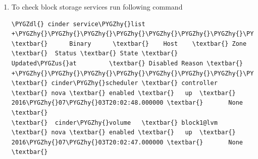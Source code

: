 \documentclass[letterpaper,10pt,english]{sphinxmanual}
\def\PYGZus{\char`\_}
\def\PYGZdl{\char`\$}
\def\PYGZhy{\char`\-}
\begin{document}
\begin{enumerate}
\item {} 
To check block storage services run following command

\begin{Verbatim}[commandchars=\\\{\}]
\PYGZdl{} cinder service\PYGZhy{}list
+\PYGZhy{}\PYGZhy{}\PYGZhy{}\PYGZhy{}\PYGZhy{}\PYGZhy{}\PYGZhy{}\PYGZhy{}\PYGZhy{}\PYGZhy{}\PYGZhy{}\PYGZhy{}\PYGZhy{}\PYGZhy{}\PYGZhy{}\PYGZhy{}\PYGZhy{}\PYGZhy{}+\PYGZhy{}\PYGZhy{}\PYGZhy{}\PYGZhy{}\PYGZhy{}\PYGZhy{}\PYGZhy{}\PYGZhy{}\PYGZhy{}\PYGZhy{}\PYGZhy{}\PYGZhy{}+\PYGZhy{}\PYGZhy{}\PYGZhy{}\PYGZhy{}\PYGZhy{}\PYGZhy{}+\PYGZhy{}\PYGZhy{}\PYGZhy{}\PYGZhy{}\PYGZhy{}\PYGZhy{}\PYGZhy{}\PYGZhy{}\PYGZhy{}+\PYGZhy{}\PYGZhy{}\PYGZhy{}\PYGZhy{}\PYGZhy{}\PYGZhy{}\PYGZhy{}+\PYGZhy{}\PYGZhy{}\PYGZhy{}\PYGZhy{}\PYGZhy{}\PYGZhy{}\PYGZhy{}\PYGZhy{}\PYGZhy{}\PYGZhy{}\PYGZhy{}\PYGZhy{}\PYGZhy{}\PYGZhy{}\PYGZhy{}\PYGZhy{}\PYGZhy{}\PYGZhy{}\PYGZhy{}\PYGZhy{}\PYGZhy{}\PYGZhy{}\PYGZhy{}\PYGZhy{}\PYGZhy{}\PYGZhy{}\PYGZhy{}\PYGZhy{}+\PYGZhy{}\PYGZhy{}\PYGZhy{}\PYGZhy{}\PYGZhy{}\PYGZhy{}\PYGZhy{}\PYGZhy{}\PYGZhy{}\PYGZhy{}\PYGZhy{}\PYGZhy{}\PYGZhy{}\PYGZhy{}\PYGZhy{}\PYGZhy{}\PYGZhy{}+
\textbar{}      Binary      \textbar{}    Host    \textbar{} Zone \textbar{}  Status \textbar{} State \textbar{}         Updated\PYGZus{}at         \textbar{} Disabled Reason \textbar{}
+\PYGZhy{}\PYGZhy{}\PYGZhy{}\PYGZhy{}\PYGZhy{}\PYGZhy{}\PYGZhy{}\PYGZhy{}\PYGZhy{}\PYGZhy{}\PYGZhy{}\PYGZhy{}\PYGZhy{}\PYGZhy{}\PYGZhy{}\PYGZhy{}\PYGZhy{}\PYGZhy{}+\PYGZhy{}\PYGZhy{}\PYGZhy{}\PYGZhy{}\PYGZhy{}\PYGZhy{}\PYGZhy{}\PYGZhy{}\PYGZhy{}\PYGZhy{}\PYGZhy{}\PYGZhy{}+\PYGZhy{}\PYGZhy{}\PYGZhy{}\PYGZhy{}\PYGZhy{}\PYGZhy{}+\PYGZhy{}\PYGZhy{}\PYGZhy{}\PYGZhy{}\PYGZhy{}\PYGZhy{}\PYGZhy{}\PYGZhy{}\PYGZhy{}+\PYGZhy{}\PYGZhy{}\PYGZhy{}\PYGZhy{}\PYGZhy{}\PYGZhy{}\PYGZhy{}+\PYGZhy{}\PYGZhy{}\PYGZhy{}\PYGZhy{}\PYGZhy{}\PYGZhy{}\PYGZhy{}\PYGZhy{}\PYGZhy{}\PYGZhy{}\PYGZhy{}\PYGZhy{}\PYGZhy{}\PYGZhy{}\PYGZhy{}\PYGZhy{}\PYGZhy{}\PYGZhy{}\PYGZhy{}\PYGZhy{}\PYGZhy{}\PYGZhy{}\PYGZhy{}\PYGZhy{}\PYGZhy{}\PYGZhy{}\PYGZhy{}\PYGZhy{}+\PYGZhy{}\PYGZhy{}\PYGZhy{}\PYGZhy{}\PYGZhy{}\PYGZhy{}\PYGZhy{}\PYGZhy{}\PYGZhy{}\PYGZhy{}\PYGZhy{}\PYGZhy{}\PYGZhy{}\PYGZhy{}\PYGZhy{}\PYGZhy{}\PYGZhy{}+
\textbar{} cinder\PYGZhy{}scheduler \textbar{} controller \textbar{} nova \textbar{} enabled \textbar{}   up  \textbar{} 2016\PYGZhy{}07\PYGZhy{}03T20:02:48.000000 \textbar{}       None      \textbar{}
\textbar{}  cinder\PYGZhy{}volume   \textbar{} block1@lvm \textbar{} nova \textbar{} enabled \textbar{}   up  \textbar{} 2016\PYGZhy{}07\PYGZhy{}03T20:02:47.000000 \textbar{}       None      \textbar{}

\end{Verbatim}
\end{enumerate}
\end{document}
